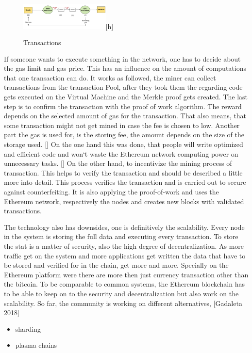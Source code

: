 \begin{figure}
\caption{Transactions} 
\includegraphics[width=0.4\textwidth]{gastransactions}[h]
\end{figure}

If someone wants to execute something in the network, one has to decide about the gas limit and gas price. This has an influence on the amount of computations that one transaction can do. It works as followed, the miner can collect transactions from the transaction Pool, after they took them the regarding code gets executed on the Virtual Machine and the Merkle proof gets created. The last step is to confirm the transaction with the proof of work algorithm. The reward depends on the selected amount of gas for the transaction. That also means, that some transaction might not get mined in case the fee is chosen to low. Another part the gas is used for, is the storing fee, the amount depends on the size of the storage used. []
On the one hand this was done, that people will write optimized and efficient code and won`t waste the Ethereum network computing power on unnecessary tasks. [] On the other hand, to incentivize the mining process of transaction. This helps to verify the transaction and should be described a little more into detail. This process verifies the transaction and is carried out to secure against counterfeiting. It is also applying the proof-of-work and uses the Ethereum network, respectively the nodes and creates new blocks with validated transactions. 

The technology also has downsides, one is definitively the scalability. Every node in the system is storing the full data and executing every transaction. To store the stat is a matter of security, also the high degree of decentralization. As more traffic get on the system and more applications get written the data that have to be stored and verified for in the chain, get more and more. Specially on the Ethereum platform were there are more then just currency transaction other than the bitcoin. To be comparable to common systems, the Ethereum blockchain has to be able to keep on to the security and decentralization but also work on the scalability. 
So far, the community is working on different alternatives, [Gadaleta 2018]

\begin{itemize}
\item sharding
\item plasma chains
\end{itemize}

